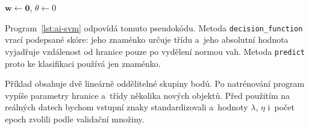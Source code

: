 \begin{algorithm}
    \caption{\textsc{svm-sgd}}
    \label{alg:ai-svm}
    \(\mathbf{w}\gets\mathbf{0}\), \(\theta\gets0\)\\
\end{algorithm}

Program~\ref{lst:ai-svm} odpovídá tomuto pseudokódu. Metoda \texttt{decision\_function} vrací podepsané skóre: jeho znaménko určuje třídu a~jeho absolutní hodnota vyjadřuje vzdálenost od hranice pouze po vydělení normou vah. Metoda \texttt{predict} proto ke klasifikaci používá jen znaménko.



Příklad obsahuje dvě lineárně oddělitelné skupiny bodů. Po natrénování program vypíše parametry hranice a~třídy několika nových objektů. Před použitím na reálných datech bychom vstupní znaky standardizovali a~hodnoty \(\lambda\), \(\eta\) i~počet epoch zvolili podle validační množiny.
